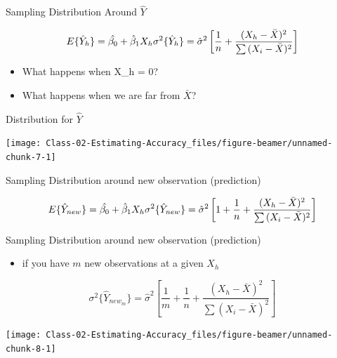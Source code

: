 \documentclass[
  ignorenonframetext,
]{beamer}
\providecommand{\tightlist}{%
  \setlength{\itemsep}{0pt}\setlength{\parskip}{0pt}}
\begin{document}
\begin{frame}{Sampling Distribution Around \(\hat{Y}\)}
\protect\hypertarget{sampling-distribution-around-haty}{}

\[
E\{\hat{Y}_h\} = \hat{\beta_0} + \hat\beta_1X_h \\
\sigma^2\{\hat{Y}_h\} = \hat\sigma^2  \left[\frac{1}{n} +  \frac{(X_h - \bar{X})^2}{\sum{(X_i - \bar{X})^2}} \right]
\]

\begin{itemize}
\tightlist
\item
  What happens when X\_h = 0?
\item
  What happens when we are far from \(\bar{X}\)?
\end{itemize}

\end{frame}

\begin{frame}{Distribution for \(\hat{Y}\)}
\protect\hypertarget{distribution-for-haty}{}

\begin{center}\texttt{[image: Class-02-Estimating-Accuracy\_files/figure-beamer/unnamed-chunk-7-1]} \end{center}

\end{frame}

\begin{frame}{Sampling Distribution around new observation (prediction)}
\protect\hypertarget{sampling-distribution-around-new-observation-prediction}{}

\[
E\{\hat{Y}_{new}\} = \hat{\beta_0} + \hat\beta_1X_h \\
\sigma^2\{\hat{Y}_{new}\} = \hat\sigma^2  \left[1 + \frac{1}{n} +  \frac{(X_h - \bar{X})^2}{\sum{(X_i - \bar{X})^2}} \right]
\]

\end{frame}

\begin{frame}{Sampling Distribution around new observation (prediction)}
\protect\hypertarget{sampling-distribution-around-new-observation-prediction-1}{}

\begin{itemize}
\tightlist
\item
  if you have \(m\) new observations at a given \(X_h\)
\end{itemize}

\[
\sigma^2\{\hat{Y}_{new_m}\} = \hat\sigma^2  \left[\frac{1}{m} + \frac{1}{n} +  \frac{(X_h - \bar{X})^2}{\sum{(X_i - \bar{X})^2}} \right]
\]

\begin{center}\texttt{[image: Class-02-Estimating-Accuracy\_files/figure-beamer/unnamed-chunk-8-1]} \end{center}

\end{frame}
\end{document}
